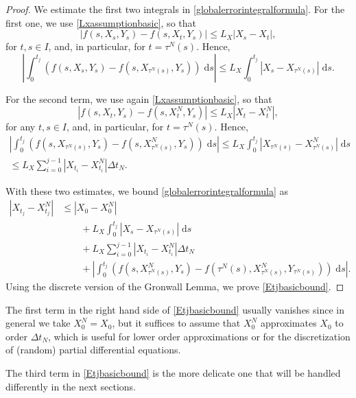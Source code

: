 \documentclass[reqno,12pt]{amsart}
\theoremstyle{plain}%
\theoremstyle{definition}
\begin{document}
\begin{proof}
    We estimate the first two integrals in \eqref{globalerrorintegralformula}. For the first one, we use \eqref{Lxassumptionbasic}, so that
    $$
        |f(s, X_s, Y_s) - f(s, X_t, Y_s)| \leq L_X |X_s - X_t|,
    $$
    for $t, s \in I$, and, in particular, for $t = \tau^N(s)$. Hence,
    $$
        \left|\int_0^{t_j} \left( f(s, X_s, Y_s) - f(s, X_{\tau^N(s)}, Y_s) \right)\;\mathrm{d}s \right| \leq L_X \int_0^{t_j} |X_s - X_{\tau^N(s)}| \;\mathrm{d}s.
    $$
    
    For the second term, we use again \eqref{Lxassumptionbasic}, so that
    $$
        |f(s, X_t, Y_s) - f(s, X_t^N, Y_s)| \leq L_X |X_t - X_t^N|,
    $$
    for any $t, s \in I$, and, in particular, for $t = \tau^N(s)$. Hence,
    \begin{multline*}
        \left|\int_0^{t_j} \left( f(s, X_{\tau^N(s)}, Y_s) - f(s, X_{\tau^N(s)}^N, Y_s) \right)\;\mathrm{d}s \right| \leq L_X \int_0^{t_j} |X_{\tau^N(s)} - X_{\tau^N(s)}^N| \;\mathrm{d}s \\
        \leq L_X\sum_{i=0}^{j-1} |X_{t_i} - X_{t_i}^N|\Delta t_N.
    \end{multline*}
    
    With these two estimates, we bound \eqref{globalerrorintegralformula} as
    \begin{align*}
        |X_{t_j} - X_{t_j}^N| & \leq |X_0 - X_0^N| \\
        & \qquad + L_X \int_0^{t_j} |X_s - X_{\tau^N(s)}| \;\mathrm{d}s  \\ 
        & \qquad + L_X\sum_{i=0}^{j-1} |X_{t_i} - X_{t_i}^N|\Delta t_N \\
        & \qquad + \left|\int_0^{t_j} \left( f(s, X_{\tau^N(s)}^N, Y_s) - f(\tau^N(s), X_{\tau^N(s)}^N, Y_{\tau^N(s)}) \right)\;\mathrm{d}s\right|.
    \end{align*}
    Using the discrete version of the Gronwall Lemma, we prove \eqref{Etjbasicbound}.
\end{proof}

The first term in the right hand side of \eqref{Etjbasicbound} usually vanishes since in general we take $X_0^N = X_0$, but it suffices to assume that $X_0^N$ approximates $X_0$ to order $\Delta t_N$, which is useful for lower order approximations or for the discretization of (random) partial differential equations.

The third term in \eqref{Etjbasicbound} is the more delicate one that will be handled differently in the next sections.
\end{document}
